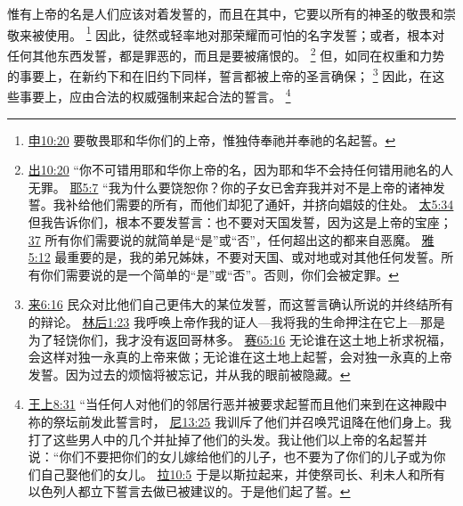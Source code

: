 \documentclass[12pt, a4paper, oneside]{ctexart}
\newcounter{parnum}[section]
\newcommand{\N}{%
   \noindent\refstepcounter{parnum}%
    \makebox[\parindent][l]{\textbf{\arabic{parnum}.}}}
\begin{document}
\N 惟有上帝的名是人们应该对着发誓的，而且在其中，它要以所有的神圣的敬畏和崇敬来被使用。
	\footnote {
		\href{https://biblehub.com/deuteronomy/6-13.htm}{申10:20} 要敬畏耶和华你们的上帝，惟独侍奉祂并奉祂的名起誓。
	}
	因此，徒然或轻率地对那荣耀而可怕的名字发誓；或者，根本对任何其他东西发誓，都是罪恶的，而且是要被痛恨的。
	\footnote {
		\href{https://biblehub.com/exodus/20-7.htm}{出10:20} “你不可错用耶和华你上帝的名，因为耶和华不会持任何错用祂名的人无罪。
		\href{https://biblehub.com/jeremiah/5-7.htm}{耶5:7} “我为什么要饶恕你？你的子女已舍弃我并对不是上帝的诸神发誓。我补给他们需要的所有，而他们却犯了通奸，并挤向娼妓的住处。
		\href{https://biblehub.com/matthew/5-34.htm}{太5:34} 但我告诉你们，根本不要发誓言：也不要对天国发誓，因为这是上帝的宝座；
		\href{https://biblehub.com/matthew/5-37.htm}{37} 所有你们需要说的就简单是“是”或“否”，任何超出这的都来自恶魔。
		\href{https://biblehub.com/james/5-12.htm}{雅5:12} 最重要的是，我的弟兄姊妹，不要对天国、或对地或对其他任何发誓。所有你们需要说的是一个简单的“是”或“否”。否则，你们会被定罪。
	}
	但，如同在权重和力势的事要上，在新约下和在旧约下同样，誓言都被上帝的圣言确保；
	\footnote {
		\href{https://biblehub.com/hebrews/6-16.htm}{来6:16} 民众对比他们自己更伟大的某位发誓，而这誓言确认所说的并终结所有的辩论。
		\href{https://biblehub.com/2_corinthians/1-23.htm}{林后1:23} 我呼唤上帝作我的证人---我将我的生命押注在它上---那是为了轻饶你们，我才没有返回哥林多。
		\href{https://biblehub.com/isaiah/65-16.htm}{赛65:16} 无论谁在这土地上祈求祝福，会这样对独一永真的上帝来做；无论谁在这土地上起誓，会对独一永真的上帝发誓。因为过去的烦恼将被忘记，并从我的眼前被隐藏。
	}
	因此，在这些事要上，应由合法的权威强制来起合法的誓言。
	\footnote {
		\href{https://biblehub.com/1_kings/8-31.htm}{王上8:31} “当任何人对他们的邻居行恶并被要求起誓而且他们来到在这神殿中祢的祭坛前发此誓言时，
		\href{https://biblehub.com/nehemiah/13-25.htm}{尼13:25} 我训斥了他们并召唤咒诅降在他们身上。我打了这些男人中的几个并扯掉了他们的头发。我让他们以上帝的名起誓并说：“你们不要把你们的女儿嫁给他们的儿子，也不要为了你们的儿子或为你们自己娶他们的女儿。
		\href{https://biblehub.com/ezra/10-5.htm}{拉10:5} 于是以斯拉起来，并使祭司长、利未人和所有以色列人都立下誓言去做已被建议的。于是他们起了誓。
	}
\end{document}
